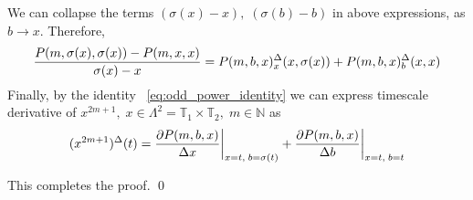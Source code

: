 We can collapse the terms $(\sigma(x) - x), \; (\sigma(b) - b)$ in above expressions, as $b\to x$.
Therefore,
\[
    \frac{P ( m, \sigma(x), \sigma(x) ) - P ( m, x, x )}{\sigma(x) - x}
    = P ( m, b, x )^{\Delta}_{x} (x, \sigma(x))
    + P ( m, b, x )^{\Delta}_{b} (x, x)
\]
Finally, by the identity ~\eqref{eq:odd_power_identity} we can express
timescale derivative of $x^{2m+1}, \; x\in \Lambda^2 = \mathbb{T}_1 \times \mathbb{T}_2, \; m\in\mathbb{N}$
as
\begin{equation*}
(x^{2m+1})
    ^{\Delta}(t)= \frac{\partial P ( m, b, x )}{\Delta x} \bigg |_{x = t, \; b = \sigma(t)}
    + \frac{\partial P ( m, b, x )}{\Delta b} \bigg |_{x = t, \; b = t}
\end{equation*}

This completes the proof. \qed
